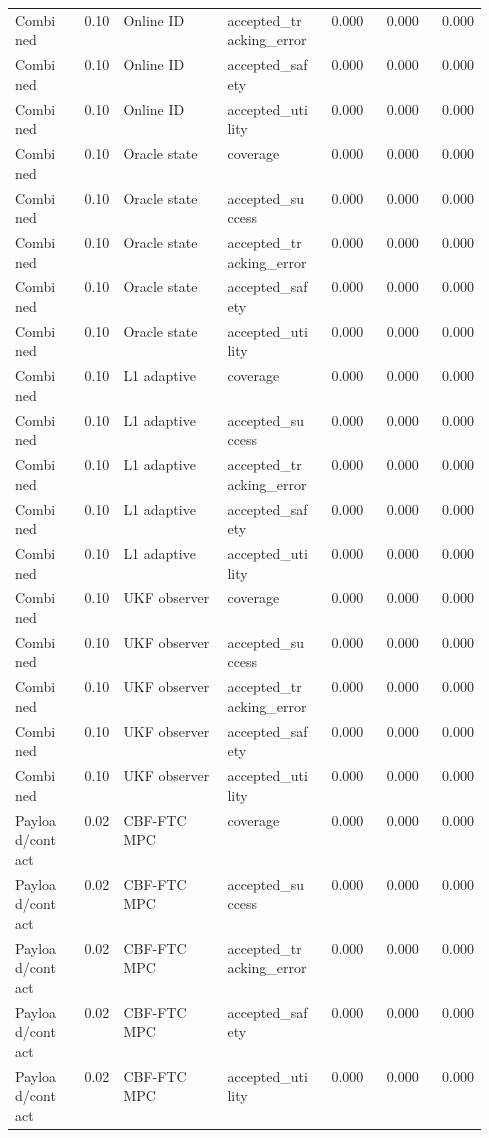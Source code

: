 \documentclass{article}
\begin{document}
\begin{center}
\begin{longtable}{p{0.13\linewidth}rp{0.22\linewidth}p{0.20\linewidth}rrr}
Combined & 0.10 & Online ID & accepted\_tracking\_error & 0.000 & 0.000 & 0.000\\
Combined & 0.10 & Online ID & accepted\_safety & 0.000 & 0.000 & 0.000\\
Combined & 0.10 & Online ID & accepted\_utility & 0.000 & 0.000 & 0.000\\
Combined & 0.10 & Oracle state & coverage & 0.000 & 0.000 & 0.000\\
Combined & 0.10 & Oracle state & accepted\_success & 0.000 & 0.000 & 0.000\\
Combined & 0.10 & Oracle state & accepted\_tracking\_error & 0.000 & 0.000 & 0.000\\
Combined & 0.10 & Oracle state & accepted\_safety & 0.000 & 0.000 & 0.000\\
Combined & 0.10 & Oracle state & accepted\_utility & 0.000 & 0.000 & 0.000\\
Combined & 0.10 & L1 adaptive & coverage & 0.000 & 0.000 & 0.000\\
Combined & 0.10 & L1 adaptive & accepted\_success & 0.000 & 0.000 & 0.000\\
Combined & 0.10 & L1 adaptive & accepted\_tracking\_error & 0.000 & 0.000 & 0.000\\
Combined & 0.10 & L1 adaptive & accepted\_safety & 0.000 & 0.000 & 0.000\\
Combined & 0.10 & L1 adaptive & accepted\_utility & 0.000 & 0.000 & 0.000\\
Combined & 0.10 & UKF observer & coverage & 0.000 & 0.000 & 0.000\\
Combined & 0.10 & UKF observer & accepted\_success & 0.000 & 0.000 & 0.000\\
Combined & 0.10 & UKF observer & accepted\_tracking\_error & 0.000 & 0.000 & 0.000\\
Combined & 0.10 & UKF observer & accepted\_safety & 0.000 & 0.000 & 0.000\\
Combined & 0.10 & UKF observer & accepted\_utility & 0.000 & 0.000 & 0.000\\
Payload/contact & 0.02 & CBF-FTC MPC & coverage & 0.000 & 0.000 & 0.000\\
Payload/contact & 0.02 & CBF-FTC MPC & accepted\_success & 0.000 & 0.000 & 0.000\\
Payload/contact & 0.02 & CBF-FTC MPC & accepted\_tracking\_error & 0.000 & 0.000 & 0.000\\
Payload/contact & 0.02 & CBF-FTC MPC & accepted\_safety & 0.000 & 0.000 & 0.000\\
Payload/contact & 0.02 & CBF-FTC MPC & accepted\_utility & 0.000 & 0.000 & 0.000\\

\end{longtable}
\end{center}
\end{document}
